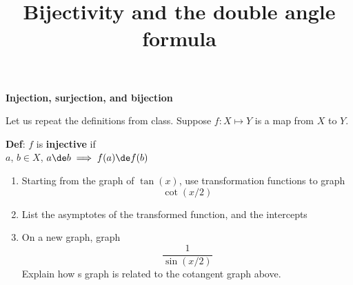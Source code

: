 \documentclass[a4paper,12pt]{article}
\begin{document}
\title {Bijectivity and the double angle formula}
\maketitle
		

\centerline{\textbf{Injection, surjection, and bijection}}

Let us repeat the definitions from class. Suppose $f:X \mapsto Y$ is a map from $X$ to $Y$.

\textbf{Def}: $f$ is \textbf{injective} if\\
\forall $a$, $b \in X$, $a \de b \implies f(a) \de f(b)$



\begin{enumerate}
	\item{Starting from the graph of $\tan(x)$, use transformation functions to graph \newline $$\cot(x/2)$$} 
	\item{List the asymptotes of the transformed function, and the intercepts}
		\item{On a new graph, graph $$\frac{1}{\sin(x/2)}$$ Explain how s graph is related to the cotangent graph above. }

\end{enumerate}
\end{document}
